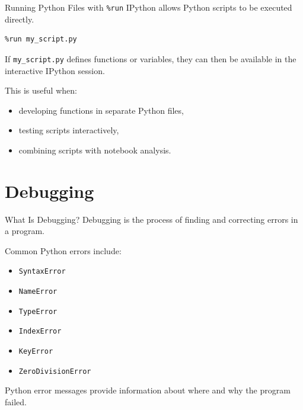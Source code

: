 \documentclass[aspectratio=169]{beamer}
\begin{document}
\begin{frame}[fragile]{Running Python Files with \texttt{\%run}}
IPython allows Python scripts to be executed directly.

\begin{lstlisting}
%run my_script.py
\end{lstlisting}

If \texttt{my\_script.py} defines functions or variables, they can then
be available in the interactive IPython session.

\vspace{0.3cm}

This is useful when:
\begin{itemize}
    \item developing functions in separate Python files,
    \item testing scripts interactively,
    \item combining scripts with notebook analysis.
\end{itemize}
\end{frame}

\section{Debugging}

\begin{frame}{What Is Debugging?}
Debugging is the process of finding and correcting errors in a program.

\vspace{0.3cm}

Common Python errors include:

\begin{itemize}
    \item \texttt{SyntaxError}
    \item \texttt{NameError}
    \item \texttt{TypeError}
    \item \texttt{IndexError}
    \item \texttt{KeyError}
    \item \texttt{ZeroDivisionError}
\end{itemize}

\vspace{0.3cm}

Python error messages provide information about where and why the
program failed.
\end{frame}
\end{document}
